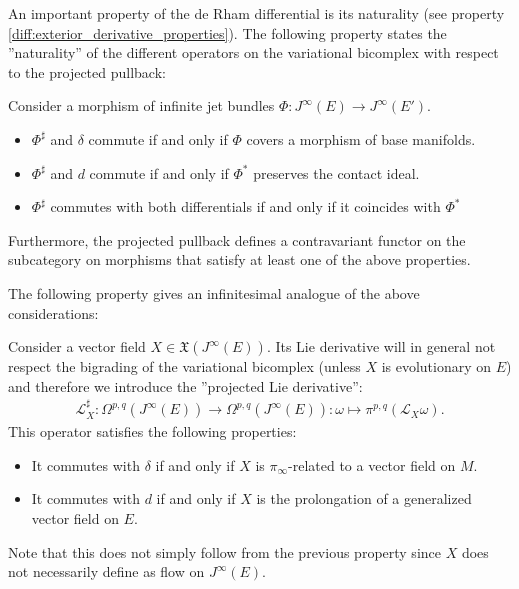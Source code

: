     An important property of the de Rham differential is its naturality (see property \ref{diff:exterior_derivative_properties}). The following property states the ''naturality'' of the different operators on the variational bicomplex with respect to the projected pullback:
    \begin{property}
        Consider a morphism of infinite jet bundles $\Phi:J^\infty(E)\rightarrow J^\infty(E')$.
        \begin{itemize}
            \item $\Phi^\sharp$ and $\delta$ commute if and only if $\Phi$ covers a morphism of base manifolds.
            \item $\Phi^\sharp$ and $d$ commute if and only if $\Phi^*$ preserves the contact ideal.
            \item $\Phi^\sharp$ commutes with both differentials if and only if it coincides with $\Phi^*$
        \end{itemize}
        Furthermore, the projected pullback defines a contravariant functor on the subcategory on morphisms that satisfy at least one of the above properties.
    \end{property}

    The following property gives an infinitesimal analogue of the above considerations:
    \begin{property}
        Consider a vector field $X\in\mathfrak{X}(J^\infty(E))$. Its Lie derivative will in general not respect the bigrading of the variational bicomplex (unless $X$ is evolutionary on $E$) and therefore we introduce the ''projected Lie derivative'':
        \begin{gather}
            \mathcal{L}^\sharp_X:\Omega^{p,q}(J^\infty(E))\rightarrow\Omega^{p,q}(J^\infty(E)):\omega\mapsto\pi^{p,q}(\mathcal{L}_X\omega).
        \end{gather}
        This operator satisfies the following properties:
        \begin{itemize}
            \item It commutes with $\delta$ if and only if $X$ is $\pi_\infty$-related to a vector field on $M$.
            \item It commutes with $d$ if and only if $X$ is the prolongation of a generalized vector field on $E$.
        \end{itemize}
        Note that this does not simply follow from the previous property since $X$ does not necessarily define as flow on $J^\infty(E)$.
    \end{property}

